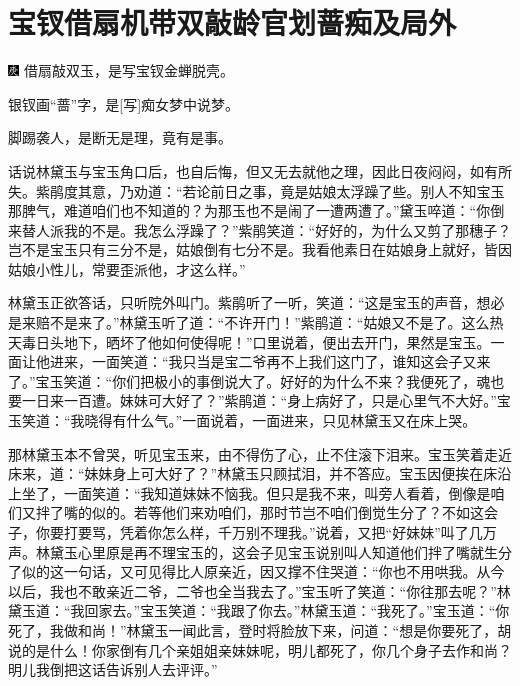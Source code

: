 

\chapter{宝钗借扇机带双敲\hspace{.5em}龄官划蔷痴及局外}

{\includegraphics[width=3mm]{../Images/00004} \kaishu 借扇敲双玉，是写宝钗金蝉脱壳。}

{\kaishu 银钗画``蔷''字，是{[}写{]}痴女梦中说梦。}

{\kaishu 脚踢袭人，是断无是理，竟有是事。}

话说林黛玉与宝玉角口后，也自后悔，但又无去就他之理，因此日夜闷闷，如有所失。紫鹃度其意，乃劝道：``若论前日之事，竟是姑娘太浮躁了些。别人不知宝玉那脾气，难道咱们也不知道的？为那玉也不是闹了一遭两遭了。''黛玉啐道：``你倒来替人派我的不是。我怎么浮躁了？''紫鹃笑道：``好好的，为什么又剪了那穗子？岂不是宝玉只有三分不是，姑娘倒有七分不是。我看他素日在姑娘身上就好，皆因姑娘小性儿，常要歪派他，才这么样。''

林黛玉正欲答话，只听院外叫门。紫鹃听了一听，笑道：``这是宝玉的声音，想必是来赔不是来了。''林黛玉听了道：``不许开门！''紫鹃道：``姑娘又不是了。这么热天毒日头地下，晒坏了他如何使得呢！''口里说着，便出去开门，果然是宝玉。一面让他进来，一面笑道：``我只当是宝二爷再不上我们这门了，谁知这会子又来了。''宝玉笑道：``你们把极小的事倒说大了。好好的为什么不来？我便死了，魂也要一日来一百遭。妹妹可大好了？''紫鹃道：``身上病好了，只是心里气不大好。''宝玉笑道：``我晓得有什么气。''一面说着，一面进来，只见林黛玉又在床上哭。

那林黛玉本不曾哭，听见宝玉来，由不得伤了心，止不住滚下泪来。宝玉笑着走近床来，道：``妹妹身上可大好了？''林黛玉只顾拭泪，并不答应。宝玉因便挨在床沿上坐了，一面笑道：``我知道妹妹不恼我。但只是我不来，叫旁人看着，倒像是咱们又拌了嘴的似的。若等他们来劝咱们，那时节岂不咱们倒觉生分了？不如这会子，你要打要骂，凭着你怎么样，千万别不理我。''说着，又把``好妹妹''叫了几万声。林黛玉心里原是再不理宝玉的，这会子见宝玉说别叫人知道他们拌了嘴就生分了似的这一句话，又可见得比人原亲近，因又撑不住哭道：``你也不用哄我。从今以后，我也不敢亲近二爷，二爷也全当我去了。''宝玉听了笑道：``你往那去呢？''林黛玉道：``我回家去。''宝玉笑道：``我跟了你去。''林黛玉道：``我死了。''宝玉道：``你死了，我做和尚！''林黛玉一闻此言，登时将脸放下来，问道：``想是你要死了，胡说的是什么！你家倒有几个亲姐姐亲妹妹呢，明儿都死了，你几个身子去作和尚？明儿我倒把这话告诉别人去评评。''

